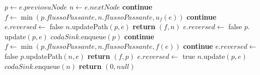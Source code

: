\documentclass{article}
\begin{document}
        \begin{algorithm}
            \begin{algorithmic}
                    \STATE $p \leftarrow e.previosuNode$
                    \STATE $n \leftarrow e.nextNode$
                                \STATE \textbf{continue}
                            \ELSE
                                \STATE $f \leftarrow \min(p.flussoPassante,n.flussoPassante,u_f(e))$
                                    \STATE \textbf{continue}
                                \ENDIF
                                \STATE $e.reversed \leftarrow$ false
                                \STATE $n.$updatePath$(p,e)$
                                \STATE \textbf{return} $(f,n)$
                            \ENDIF
                        \ENDIF
                        \STATE $e.reversed \leftarrow$ false
                        \STATE $p.$update$(p,e)$
                        \STATE $codaSink.$enqueue$(p)$
                                \STATE \textbf{continue}
                            \ELSE
                                \STATE $f \leftarrow \min(p.flussoPassante,n.flussoPassante,f(e))$
                                    \STATE \textbf{continue}
                                \ENDIF
                                \STATE $e.reversed \leftarrow$ false
                                \STATE $p.$updatePath$(n,e)$
                                \STATE \textbf{return} $(f,p)$
                            \ENDIF
                        \ENDIF
                        \STATE $e.reversed \leftarrow $ true
                        \STATE $n.$update$(p,e)$
                        \STATE $codaSink.$enqueue$(n)$
                    \ENDIF
                \ENDFOR
            \ENDIF
        \ENDWHILE
        \STATE \textbf{return} $(0,null)$
    \end{algorithmic}
\end{algorithm}
\newpage
\end{document}
